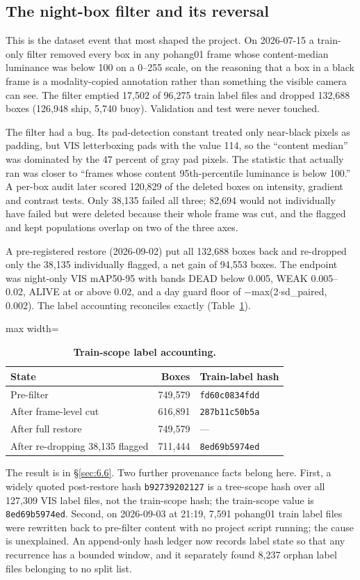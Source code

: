 \documentclass[10pt]{article}
\begin{document}
\subsection{The night-box filter and its reversal}\label{app:B.4}
This is the dataset event that most shaped the project. On 2026-07-15 a train-only filter removed every box in any pohang01 frame whose content-median luminance was below 100 on a 0--255 scale, on the reasoning that a box in a black frame is a modality-copied annotation rather than something the visible camera can see. The filter emptied 17,502 of 96,275 train label files and dropped 132,688 boxes (126,948 ship, 5,740 buoy). Validation and test were never touched.

The filter had a bug. Its pad-detection constant treated only near-black pixels as padding, but VIS letterboxing pads with the value 114, so the ``content median'' was dominated by the 47 percent of gray pad pixels. The statistic that actually ran was closer to ``frames whose content 95th-percentile luminance is below 100.'' A per-box audit later scored 120,829 of the deleted boxes on intensity, gradient and contrast tests. Only 38,135 failed all three; 82,694 would not individually have failed but were deleted because their whole frame was cut, and the flagged and kept populations overlap on two of the three axes.

A pre-registered restore (2026-09-02) put all 132,688 boxes back and re-dropped only the 38,135 individually flagged, a net gain of 94,553 boxes. The endpoint was night-only VIS mAP50-95 with bands DEAD below 0.005, WEAK 0.005--0.02, ALIVE at or above 0.02, and a day guard floor of $-$max(2$\cdot$sd\_paired, 0.002). The label accounting reconciles exactly (Table~\ref{tab:D}).

\begin{table}[htbp]
\centering
\small
\caption{\textbf{Train-scope label accounting.}}
\label{tab:D}
\begin{adjustbox}{max width=\linewidth}
\begin{tabular}{lrl}
\toprule
State & Boxes & Train-label hash \\
\midrule
Pre-filter & 749,579 & \texttt{fd60c0834fdd} \\
After frame-level cut & 616,891 & \texttt{287b11c50b5a} \\
After full restore & 749,579 & --- \\
After re-dropping 38,135 flagged & 711,444 & \texttt{8ed69b5974ed} \\
\bottomrule
\end{tabular}
\end{adjustbox}
\end{table}
The result is in \S\ref{sec:6.6}. Two further provenance facts belong here. First, a widely quoted post-restore hash \texttt{b92739202127} is a tree-scope hash over all 127,309 VIS label files, not the train-scope hash; the train-scope value is \texttt{8ed69b5974ed}. Second, on 2026-09-03 at 21:19, 7,591 pohang01 train label files were rewritten back to pre-filter content with no project script running; the cause is unexplained. An append-only hash ledger now records label state so that any recurrence has a bounded window, and it separately found 8,237 orphan label files belonging to no split list.
\end{document}
